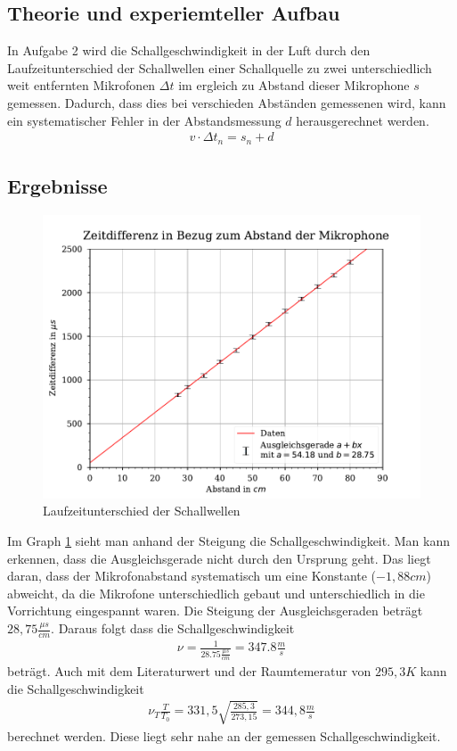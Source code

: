 \documentclass[11pt, a4paper]{article}
\begin{document}
    \subsection{Theorie und experiemteller Aufbau}
    In Aufgabe 2 wird die Schallgeschwindigkeit in der Luft durch den Laufzeitunterschied der Schallwellen einer Schallquelle zu zwei unterschiedlich
    weit entfernten Mikrofonen $\Delta t$ im ergleich zu Abstand dieser Mikrophone $s$ gemessen. Dadurch, dass dies bei verschieden Abständen gemessenen wird, kann ein systematischer
    Fehler in der Abstandsmessung $d$ herausgerechnet werden.
    \begin{align}
        v \cdot \Delta t_n = s_n + d
    \end{align}

    \subsection{Ergebnisse}
    \begin{figure}[!h]
        \centering
        \includegraphics[width=120mm]{./2Mikros.pdf}

        \caption{Laufzeitunterschied der Schallwellen}
        \label{fig:graph2}
    \end{figure}
    Im Graph \ref{fig:graph2} sieht man anhand der Steigung die Schallgeschwindigkeit. Man kann erkennen, dass die Ausgleichsgerade nicht durch den Ursprung geht. Das liegt daran,
    dass der Mikrofonabstand systematisch um eine Konstante ($-1,88cm$) abweicht, da die Mikrofone unterschiedlich gebaut und unterschiedlich in die 
    Vorrichtung eingespannt waren. Die Steigung der Ausgleichsgeraden beträgt $28,75\frac{\mu s}{cm}$. Daraus folgt
    dass die Schallgeschwindigkeit
    \begin{align} \label{sch1}
        \nu = \frac{1}{28.75\frac{\mu s}{cm}} = 347.8\frac{m}{s}
    \end{align}
    beträgt. Auch mit dem Literaturwert und der Raumtemeratur von $295,3K$ kann die Schallgeschwindigkeit
    \begin{align} \label{sch2}
        \nu_T\frac{T}{T_0} = 331,5 \sqrt{\frac{285,3}{273,15}} = 344,8\frac{m}{s}
    \end{align}
    berechnet werden. Diese liegt sehr nahe an der gemessen Schallgeschwindigkeit.
\end{document}
